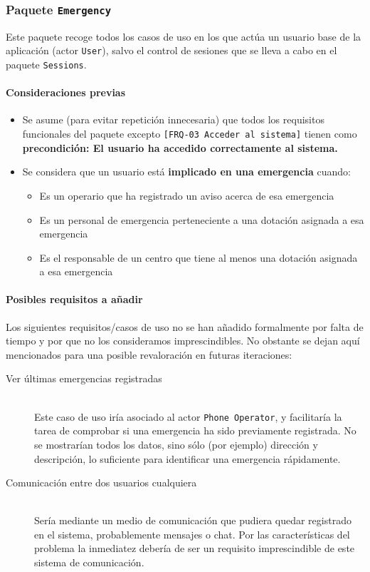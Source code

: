\subsubsection{Paquete \texttt{Emergency}}

Este paquete recoge todos los casos de uso en los que actúa un usuario base de la aplicación (actor \texttt{User}),
salvo el control de sesiones que se lleva a cabo en el paquete \texttt{Sessions}.
\par

\paragraph{Consideraciones previas}
\begin{itemize}
    \item{Se asume (para evitar repetición innecesaria) que todos los requisitos funcionales del paquete excepto \texttt{[FRQ-03 Acceder al sistema]} tienen como \textbf{precondición: El usuario ha accedido correctamente al sistema.}}
    \item{Se considera que un usuario está \textbf{implicado en una emergencia} cuando:
        \begin{itemize}
            \item{Es un operario que ha registrado un aviso acerca de esa emergencia}
            \item{Es un personal de emergencia perteneciente a una dotación asignada a esa emergencia}
            \item{Es el responsable de un centro que tiene al menos una dotación asignada a esa emergencia}
        \end{itemize}
    }
\end{itemize}

\paragraph{Posibles requisitos a añadir}

Los siguientes requisitos/casos de uso no se han añadido formalmente por falta de tiempo y por que no los consideramos imprescindibles. No obstante se dejan aquí mencionados para una posible revaloración en futuras iteraciones:
\begin{description}
    \item[Ver últimas emergencias registradas] \hfill \\
        Este caso de uso iría asociado al actor \texttt{Phone Operator}, y facilitaría la tarea de comprobar si una emergencia ha sido previamente registrada. No se mostrarían todos los datos, sino sólo (por ejemplo) dirección y descripción, lo suficiente para identificar una emergencia rápidamente.
    \item[Comunicación entre dos usuarios cualquiera] \hfill \\
        Sería mediante un medio de comunicación que pudiera quedar registrado en el sistema, probablemente mensajes o chat. Por las características del problema la inmediatez debería de ser un requisito imprescindible de este sistema de comunicación.
\end{description}

